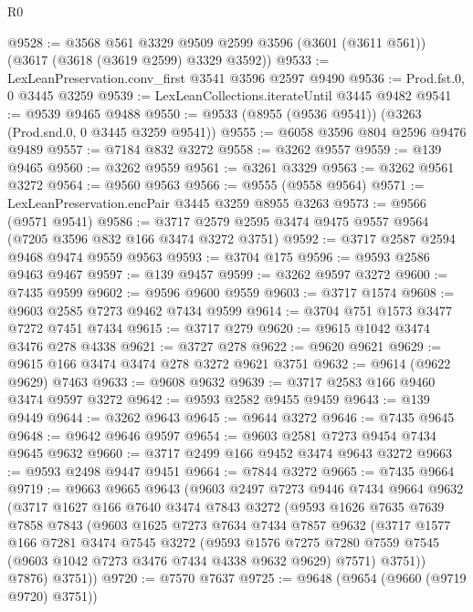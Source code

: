 \begin{lexlean}{R0}
\begin{coremodule}
@9528 := @3568
    @561
    @3329
    @9509
    @2599
    @3596
    (@3601 (@3611 @561))
    (@3617 (@3618 (@3619 @2599) @3329 @3592))
@9533 := LexLeanPreservation.conv_first @3541 @3596 @2597 @9490
@9536 := Prod.fst.{0, 0} @3445 @3259
@9539 := LexLeanCollections.iterateUntil @3445 @9482
@9541 := @9539 @9465 @9488
@9550 := @9533 (@8955 (@9536 @9541)) (@3263 (Prod.snd.{0, 0} @3445 @3259 @9541))
@9555 := @6058 @3596 @804 @2596 @9476 @9489
@9557 := @7184 @832 @3272
@9558 := @3262 @9557
@9559 := @139 @9465
@9560 := @3262 @9559
@9561 := @3261 @3329
@9563 := @3262 @9561 @3272
@9564 := @9560 @9563
@9566 := @9555 (@9558 @9564)
@9571 := LexLeanPreservation.encPair @3445 @3259 @8955 @3263
@9573 := @9566 (@9571 @9541)
@9586 := @3717 @2579 @2595 @3474 @9475 @9557 @9564 (@7205 @3596 @832 @166 @3474 @3272 @3751)
@9592 := @3717 @2587 @2594 @9468 @9474 @9559 @9563
@9593 := @3704 @175
@9596 := @9593 @2586 @9463 @9467
@9597 := @139 @9457
@9599 := @3262 @9597 @3272
@9600 := @7435 @9599
@9602 := @9596 @9600 @9559
@9603 := @3717 @1574
@9608 := @9603 @2585 @7273 @9462 @7434 @9599
@9614 := @3704 @751 @1573 @3477 @7272 @7451 @7434
@9615 := @3717 @279
@9620 := @9615 @1042 @3474 @3476 @278 @4338
@9621 := @3727 @278
@9622 := @9620 @9621
@9629 := @9615 @166 @3474 @3474 @278 @3272 @9621 @3751
@9632 := @9614 (@9622 @9629) @7463
@9633 := @9608 @9632
@9639 := @3717 @2583 @166 @9460 @3474 @9597 @3272
@9642 := @9593 @2582 @9455 @9459
@9643 := @139 @9449
@9644 := @3262 @9643
@9645 := @9644 @3272
@9646 := @7435 @9645
@9648 := @9642 @9646 @9597
@9654 := @9603 @2581 @7273 @9454 @7434 @9645 @9632
@9660 := @3717 @2499 @166 @9452 @3474 @9643 @3272
@9663 := @9593 @2498 @9447 @9451
@9664 := @7844 @3272
@9665 := @7435 @9664
@9719 := @9663
    @9665
    @9643
    (@9603
      @2497
      @7273
      @9446
      @7434
      @9664
      @9632
      (@3717
        @1627
        @166
        @7640
        @3474
        @7843
        @3272
        (@9593
          @1626
          @7635
          @7639
          @7858
          @7843
          (@9603
            @1625
            @7273
            @7634
            @7434
            @7857
            @9632
            (@3717
              @1577
              @166
              @7281
              @3474
              @7545
              @3272
              (@9593
                @1576
                @7275
                @7280
                @7559
                @7545
                (@9603 @1042 @7273 @3476 @7434 @4338 @9632 @9629)
                @7571)
              @3751))
          @7876)
        @3751))
@9720 := @7570 @7637
@9725 := @9648 (@9654 (@9660 (@9719 @9720) @3751))

\end{coremodule}
\end{lexlean}
